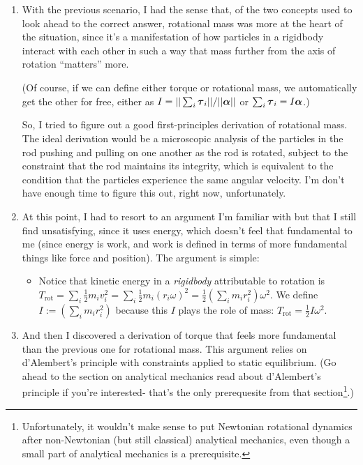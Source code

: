 \documentclass{article}
\begin{document}
\begin{enumerate}
    \item With the previous scenario, I had the sense that, of the two concepts used to look ahead to the correct answer, rotational mass was more at the heart of the situation, since it's a manifestation of how particles in a rigidbody interact with each other in such a way that mass further from the axis of rotation ``matters'' more.

    (Of course, if we can define either torque or rotational mass, we automatically get the other for free, either as $I = ||\sum_i \boldsymbol{\tau}_i||/||\boldsymbol{\alpha}||$ or $\sum_i \boldsymbol{\tau}_i = I \boldsymbol{\alpha}$.)

    So, I tried to figure out a good first-principles derivation of rotational mass. The ideal derivation would be a microscopic analysis of the particles in the rod pushing and pulling on one another as the rod is rotated, subject to the constraint that the rod maintains its integrity, which is equivalent to the condition that the particles experience the same angular velocity. I'm don't have enough time to figure this out, right now, unfortunately.

    \item At this point, I had to resort to an argument I'm familiar with but that I still find unsatisfying, since it uses energy, which doesn't feel that fundamental to me (since energy is work, and work is defined in terms of more fundamental things like force and position). The argument is simple:
    \begin{itemize}
        \item Notice that kinetic energy in a \textit{rigidbody} attributable to rotation is $T_{\text{rot}} = \sum_i \frac{1}{2} m_i v_i^2 = \sum_i \frac{1}{2} m_i (r_i \omega)^2 = \frac{1}{2} (\sum_i m_i r_i^2) \omega^2$. We define $I := (\sum_i m_i r_i^2)$ because this $I$ plays the role of mass: $T_{\text{rot}} = \frac{1}{2}I \omega^2$.
    \end{itemize}

    \item And then I discovered a derivation of torque that feels more fundamental than the previous one for rotational mass. This argument relies on d'Alembert's principle with constraints applied to static equilibrium. (Go ahead to the section on analytical mechanics read about d'Alembert's principle if you're interested- that's the only prerequesite from that section\footnote{Unfortunately, it wouldn't make sense to put Newtonian rotational dynamics after non-Newtonian (but still classical) analytical mechanics, even though a small part of analytical mechanics is a prerequisite.}.)


\end{enumerate}
\end{document}
